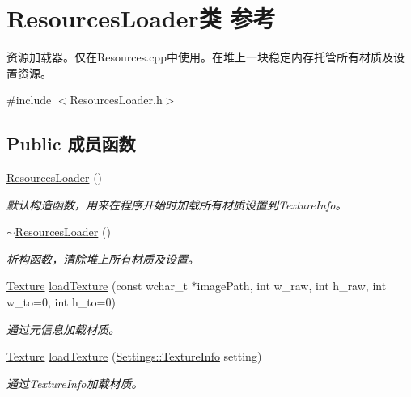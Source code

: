 \hypertarget{class_resources_loader}{}\section{Resources\+Loader类 参考}
\label{class_resources_loader}


资源加载器。仅在Resources.\+cpp中使用。在堆上一块稳定内存托管所有材质及设置资源。  




{\ttfamily \#include $<$Resources\+Loader.\+h$>$}

\subsection*{Public 成员函数}
\begin{DoxyCompactItemize}
\item 
\hyperlink{class_resources_loader_a571b6232d8f1dc1cf94ec752c984a834}{Resources\+Loader} ()
\begin{DoxyCompactList}\small\item\em 默认构造函数，用来在程序开始时加载所有材质设置到Texture\+Info。 \end{DoxyCompactList}\item 
\hyperlink{class_resources_loader_ab4f7fa273471e91107896131bce915da}{$\sim$\+Resources\+Loader} ()
\begin{DoxyCompactList}\small\item\em 析构函数，清除堆上所有材质及设置。 \end{DoxyCompactList}\item 
\hyperlink{struct_texture}{Texture} \hyperlink{class_resources_loader_a38cbe5a4029c4a6fe999a8405703fc30}{load\+Texture} (const wchar\+\_\+t $\ast$image\+Path, int w\+\_\+raw, int h\+\_\+raw, int w\+\_\+to=0, int h\+\_\+to=0)
\begin{DoxyCompactList}\small\item\em 通过元信息加载材质。 \end{DoxyCompactList}\item 
\hyperlink{struct_texture}{Texture} \hyperlink{class_resources_loader_a29b4b9fedb76dc01abcfacc2b31cf25c}{load\+Texture} (\hyperlink{struct_settings_1_1_texture_info}{Settings\+::\+Texture\+Info} setting)
\begin{DoxyCompactList}\small\item\em 通过Texture\+Info加载材质。 \end{DoxyCompactList}\item 
\mbox{\label{class_resources_loader_a80e1d1bb8339e48b0becf401f205436e}} 

\end{DoxyCompactItemize}
